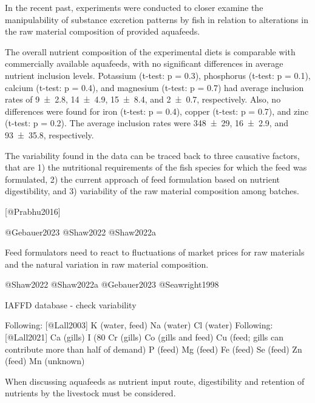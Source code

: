 
In the recent past, experiments were conducted to closer examine the manipulability of substance excretion patterns by fish in relation to alterations in the raw material composition of provided aquafeeds.



The overall nutrient composition of the experimental diets is comparable with commercially available aquafeeds, with no significant differences in average nutrient inclusion levels. Potassium (t-test: p = 0.3), phosphorus (t-test: p = 0.1), calcium (t-test: p = 0.4), and magnesium (t-test: p = 0.7) had average inclusion rates of \SI{9(2.8)}{\gkg}, \SI{14(4.9)}{\gkg}, \SI{15(8.4)}{\gkg}, and \SI{2(0.7)}{\gkg}, respectively.
Also, no differences were found for iron (t-test: p = 0.4), copper (t-test: p = 0.7), and zinc (t-test: p = 0.2). The average inclusion rates were \SI{348(29)}{\mgkg}, \SI{16(2.9)}{\mgkg}, and \SI{93(35.8)}{\mgkg}, respectively.



The variability found in the data can be traced back to three causative factors, that are 1) the nutritional requirements of the fish species for which the feed was formulated, 2) the current approach of feed formulation based on nutrient digestibility, and 3) variability of the raw material composition among batches.

[@Prabhu2016]

@Gebauer2023
@Shaw2022
@Shaw2022a

Feed formulators need to react to fluctuations of market prices for raw materials and the natural variation in raw material composition.


@Shaw2022
@Shaw2022a
@Gebauer2023
@Seawright1998

IAFFD database - check variability









Following: [@Lall2003]
K (water, feed)
Na (water)
Cl (water)
Following: [@Lall2021]
Ca (gills)
I (80%
Cr (gills)
Co (gills and feed)
Cu (feed; gills can contribute more than half of demand)
P (feed)
Mg (feed)
Fe (feed)
Se (feed)
Zn (feed)
Mn (unknown)



When discussing aquafeeds as nutrient input route, digestibility and retention of nutrients by the livestock must be considered.

